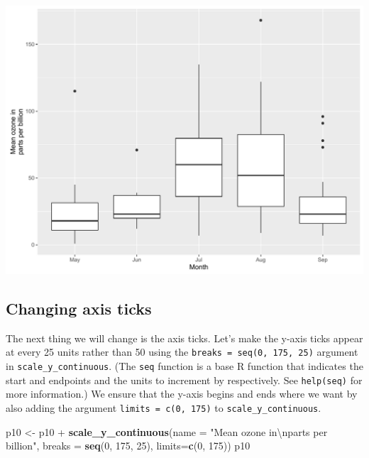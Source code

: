 \documentclass[]{article}
\newenvironment{Shaded}{\begin{snugshade}}{\end{snugshade}}
\newcommand{\KeywordTok}[1]{\textcolor[rgb]{0.13,0.29,0.53}{\textbf{{#1}}}}
\newcommand{\DataTypeTok}[1]{\textcolor[rgb]{0.13,0.29,0.53}{{#1}}}
\newcommand{\DecValTok}[1]{\textcolor[rgb]{0.00,0.00,0.81}{{#1}}}
\newcommand{\CharTok}[1]{\textcolor[rgb]{0.31,0.60,0.02}{{#1}}}
\newcommand{\StringTok}[1]{\textcolor[rgb]{0.31,0.60,0.02}{{#1}}}
\newcommand{\NormalTok}[1]{{#1}}
\begin{document}
\begin{center}\includegraphics{0_all_posts_pdf/box_3-1} \end{center}

\subsection{Changing axis ticks}\label{changing-axis-ticks-3}

The next thing we will change is the axis ticks. Let's make the y-axis
ticks appear at every 25 units rather than 50 using the
\texttt{breaks\ =\ seq(0,\ 175,\ 25)} argument in
\texttt{scale\_y\_continuous}. (The \texttt{seq} function is a base R
function that indicates the start and endpoints and the units to
increment by respectively. See \texttt{help(seq)} for more information.)
We ensure that the y-axis begins and ends where we want by also adding
the argument \texttt{limits\ =\ c(0,\ 175)} to
\texttt{scale\_y\_continuous}.

\begin{Shaded}
\begin{Highlighting}[]
\NormalTok{p10 <-}\StringTok{ }\NormalTok{p10 +}\StringTok{ }\KeywordTok{scale_y_continuous}\NormalTok{(}\DataTypeTok{name =} \StringTok{"Mean ozone in}\CharTok{\textbackslash{}n}\StringTok{parts per billion"}\NormalTok{,}
                              \DataTypeTok{breaks =} \KeywordTok{seq}\NormalTok{(}\DecValTok{0}\NormalTok{, }\DecValTok{175}\NormalTok{, }\DecValTok{25}\NormalTok{),}
                              \DataTypeTok{limits=}\KeywordTok{c}\NormalTok{(}\DecValTok{0}\NormalTok{, }\DecValTok{175}\NormalTok{))}
\NormalTok{p10}
\end{Highlighting}
\end{Shaded}
\end{document}
